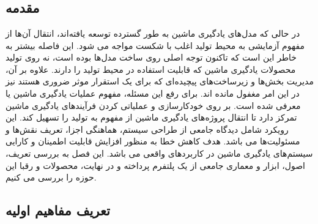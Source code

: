 \chapter{}\label{ch:HVS}
 
\section{مقدمه}
 
در حالی که مدل‌های یادگیری ماشین به طور گسترده‌ توسعه یافته‌اند، انتقال آن‌ها از مفهوم آزمایشی به محیط تولید اغلب با شکست مواجه می شود. این فاصله بیشتر به خاطر این است که تاکنون توجه اصلی روی ساخت مدل‌ها بوده است، نه روی تولید محصولات یادگیری ماشین که قابلیت استفاده در محیط تولید را دارند. علاوه بر آن، مدیریت بخش‌ها و زیرساخت‌های پیچیده‌ای که برای یک استقرار موثر ضروری هستند نیز در این امر مغفول مانده اند. برای رفع این مسئله، مفهوم عملیات یادگیری ماشین یا  معرفی شده است.  بر روی خودکارسازی و عملیاتی کردن فرآیندهای یادگیری ماشین تمرکز دارد تا انتقال پروژه‌های یادگیری ماشین از مفهوم به تولید را تسهیل کند. این رویکرد شامل دیدگاه جامعی از طراحی سیستم، هماهنگی اجزا، تعریف نقش‌ها و مسئولیت‌ها می باشد. هدف کاهش خطا به منظور افزایش قابلیت اطمینان و کارایی سیستم‌های یادگیری ماشین در کاربردهای واقعی می باشد. این فصل به بررسی تعریف، اصول، ابزار و معماری جامعی از یک پلتفرم   پرداخته و در نهایت، محصولات و رقبا این حوزه را بررسی می کنیم.

\section{تعریف مفاهیم اولیه}